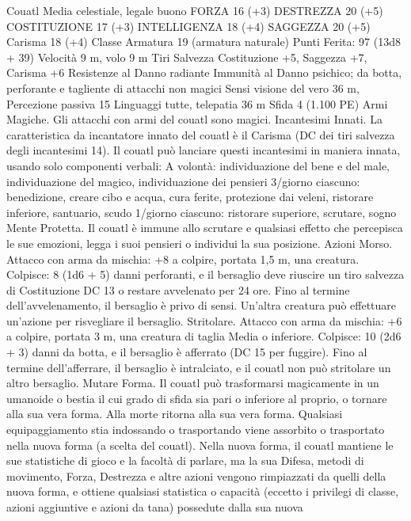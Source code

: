 \begin{multicols}{2}
Couatl
Media celestiale, legale buono
FORZA 16 (+3)
DESTREZZA 20 (+5)
COSTITUZIONE 17 (+3)
INTELLIGENZA 18 (+4)
SAGGEZZA 20 (+5)
Carisma 18 (+4)
Classe Armatura 19 (armatura naturale)
\hspace*{0pt}\hfill{Punti Ferita}: 97 (13d8 + 39)
Velocità 9 m, volo 9 m
Tiri Salvezza Costituzione +5, Saggezza +7, Carisma +6
Resistenze al Danno radiante
Immunità al Danno psichico; da botta, perforante e
tagliente di attacchi non magici
Sensi visione del vero 36 m, Percezione passiva 15
Linguaggi tutte, telepatia 36 m
Sfida 4 (1.100 PE)
Armi Magiche. Gli attacchi con armi del couatl sono magici.
Incantesimi Innati. La caratteristica da incantatore innato del
couatl è il Carisma (DC dei tiri salvezza degli incantesimi 14). Il
couatl può lanciare questi incantesimi in maniera innata, usando
solo componenti verbali:
A volontà: individuazione del bene e del male, individuazione del
magico, individuazione dei pensieri
3/giorno ciascuno: benedizione, creare cibo e acqua, cura ferite,
protezione dai veleni, ristorare inferiore, santuario, scudo
1/giorno ciascuno: ristorare superiore, scrutare, sogno
Mente Protetta. Il couatl è immune allo scrutare e qualsiasi
effetto che percepisca le sue emozioni, legga i suoi pensieri o
individui la sua posizione.
Azioni
Morso. Attacco con arma da mischia: +8 a colpire, portata 1,5
m, una creatura.
Colpisce: 8 (1d6 + 5) danni perforanti, e il bersaglio deve
riuscire un tiro salvezza di Costituzione DC 13 o restare
avvelenato per 24 ore. Fino al termine dell’avvelenamento, il
bersaglio è privo di sensi. Un’altra creatura può effettuare
un’azione per risvegliare il bersaglio.
Stritolare. Attacco con arma da mischia: +6 a colpire, portata 3
m, una creatura di taglia Media o inferiore.
Colpisce: 10 (2d6 + 3) danni da botta, e il bersaglio è afferrato
(DC 15 per fuggire). Fino al termine dell’afferrare, il bersaglio è
intralciato, e il couatl non può stritolare un altro bersaglio.
Mutare Forma. Il couatl può trasformarsi magicamente in un
umanoide o bestia il cui grado di sfida sia pari o inferiore al proprio,
o tornare alla sua vera forma. Alla morte ritorna alla sua vera forma.
Qualsiasi equipaggiamento stia indossando o trasportando viene
assorbito o trasportato nella nuova forma (a scelta del couatl).
Nella nuova forma, il couatl mantiene le sue statistiche di gioco e la
facoltà di parlare, ma la sua Difesa, metodi di movimento, Forza,
Destrezza e altre azioni vengono rimpiazzati da quelli della nuova
forma, e ottiene qualsiasi statistica o capacità (eccetto i privilegi di
classe, azioni aggiuntive e azioni da tana) possedute dalla sua nuova

\end{multicols}
